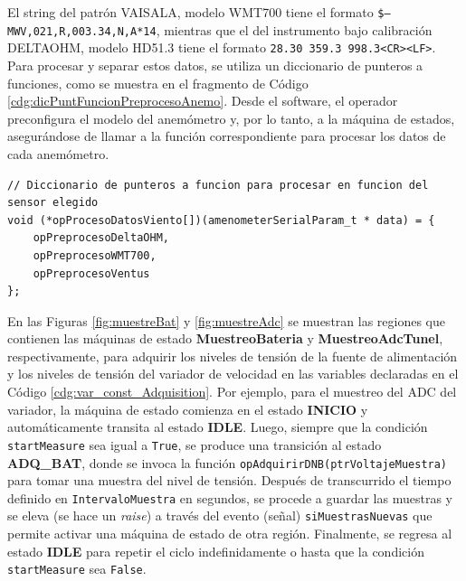 El string del patrón VAISALA, modelo WMT700 tiene el formato \texttt{\$--MWV,021,R,003.34,N,A*14}, mientras que el del instrumento bajo calibración DELTAOHM, modelo HD51.3 tiene el formato \texttt{28.30 359.3 998.3<CR><LF>}. Para procesar y separar estos datos, se utiliza un diccionario de punteros a funciones, como se muestra en el fragmento de Código \ref{cdg:dicPuntFuncionPreprocesoAnemo}. Desde el software, el operador preconfigura el modelo del anemómetro y, por lo tanto, a la máquina de estados, asegurándose de llamar a la función correspondiente para procesar los datos de cada anemómetro.

\begin{lstlisting}[style=cstyle, caption={Diccionario de punteros a función para procesar los datos recibidos de los anemómetros.}, label=cdg:dicPuntFuncionPreprocesoAnemo]
// Diccionario de punteros a funcion para procesar en funcion del sensor elegido
void (*opProcesoDatosViento[])(amenometerSerialParam_t * data) = {
    opPreprocesoDeltaOHM,
    opPreprocesoWMT700,
    opPreprocesoVentus
};
\end{lstlisting}

En las Figuras \ref{fig:muestreBat} y \ref{fig:muestreAdc} se muestran las regiones que contienen las máquinas de estado \textbf{MuestreoBateria} y \textbf{MuestreoAdcTunel}, respectivamente, para adquirir los niveles de tensión de la fuente de alimentación y los niveles de tensión del variador de velocidad en las variables declaradas en el Código \ref{cdg:var_const_Adquisition}. Por ejemplo, para el muestreo del ADC del variador, la máquina de estado comienza en el estado \textbf{INICIO} y automáticamente transita al estado \textbf{IDLE}. Luego, siempre que la condición \texttt{startMeasure} sea igual a \texttt{True}, se produce una transición al estado \textbf{ADQ\_BAT}, donde se invoca la función \texttt{opAdquirirDNB(ptrVoltajeMuestra)} para tomar una muestra del nivel de tensión. Después de transcurrido el tiempo definido en \texttt{IntervaloMuestra} en segundos, se procede a guardar las muestras y se eleva (se hace un \textit{raise}) a través del evento (señal) \texttt{siMuestrasNuevas} que permite activar una máquina de estado de otra región. Finalmente, se regresa al estado \textbf{IDLE} para repetir el ciclo indefinidamente o hasta que la condición \texttt{startMeasure} sea \texttt{False}.


